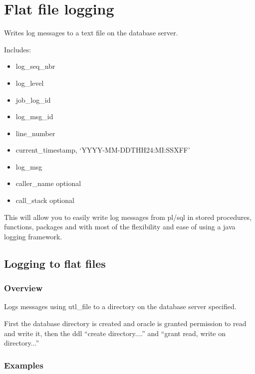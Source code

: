 \documentclass[letterpaper,10pt,english]{sphinxmanual}
\begin{document}
\section{Flat file logging}
\label{index:flat-file-logging}
Writes log messages to a text file on the database server.

Includes:
\begin{itemize}
\item {} 
log\_seq\_nbr

\item {} 
log\_level

\item {} 
job\_log\_id

\item {} 
log\_msg\_id

\item {} 
line\_number

\item {} 
current\_timestamp, `YYYY-MM-DDTHH24:MI:SSXFF'

\item {} 
log\_msg

\item {} 
caller\_name optional

\item {} 
call\_stack optional

\end{itemize}

This will allow you to easily write log messages from pl/sql in stored
procedures, functions, packages and with most of the flexibility and
ease of using a java logging framework.


\subsection{Logging to flat files}
\label{flatFile::doc}\label{flatFile:logging-to-flat-files}

\subsubsection{Overview}
\label{flatFile:overview}
Logs messages using utl\_file to a directory on the database server
specified.

First the database directory is created and oracle is granted permission
to read and write it, then the ddl ``create directory....'' and ``grant
read, write on directory...''


\subsubsection{Examples}
\label{flatFile:examples}
\end{document}
